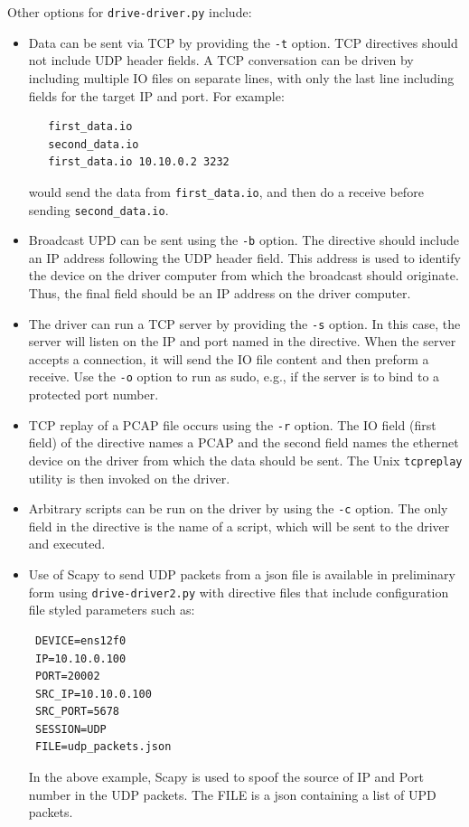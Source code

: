\documentclass[titlepage]{article}
\begin{document}
Other options for {\tt drive-driver.py} include:
\begin{itemize}
\item Data can be sent via TCP by providing the {\tt -t} option.  TCP directives should not include UDP header fields.  A TCP conversation can be driven by
including multiple IO files on separate lines, with only the last line including fields for the target IP and port.  For example:
\begin{verbatim}
   first_data.io 
   second_data.io 
   first_data.io 10.10.0.2 3232 
\end{verbatim}
would send the data from {\tt first\_data.io}, and then do a receive before sending {\tt second\_data.io}.

\item Broadcast UPD can be sent using the {\tt -b} option.  The directive should include an IP address following the UDP header field.  This
address is used to identify the device on the driver computer from which the broadcast should originate.  Thus, the final field should be
an IP address on the driver computer.

\item The driver can run a TCP server by providing the {\tt -s} option.  In this case, the server will listen on the IP and port named in the directive.
When the server accepts a connection, it will send the IO file content and then preform a receive.  Use the {\tt -o} option to run as sudo, e.g., if
the server is to bind to a protected port number.

\item TCP replay of a PCAP file occurs using the {\tt -r} option.  The IO field (first field) of the directive names a PCAP and the second field names the
ethernet device on the driver from which the data should be sent.  The Unix {\tt tcpreplay} utility is then invoked on the driver.

\item Arbitrary scripts can be run on the driver by using the {\tt -c} option.  The only field in the directive is the name of a script, which will be
sent to the driver and executed.

\item Use of Scapy to send UDP packets from a json file is available in preliminary form using {\tt drive-driver2.py} with directive files that include
configuration file styled parameters such as:
\begin{verbatim}
 DEVICE=ens12f0
 IP=10.10.0.100
 PORT=20002
 SRC_IP=10.10.0.100
 SRC_PORT=5678
 SESSION=UDP
 FILE=udp_packets.json 
\end{verbatim}
In the above example, Scapy is used to spoof the source of IP and Port number in the UDP packets.  The FILE is a json containing a list of UPD packets.
\end{itemize}
\end{document}

